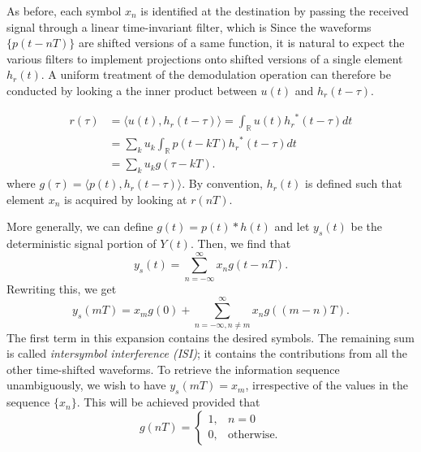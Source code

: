 As before, each symbol $x_n$ is identified at the destination by passing the received signal through a linear time-invariant filter, which is 
Since the waveforms $\{ p(t-nT) \}$ are shifted versions of a same function, it is natural to expect the various filters to implement projections onto shifted versions of a single element $h_r (t)$.
A uniform treatment of the demodulation operation can therefore be conducted by looking a the inner product between $u(t)$ and $h_r (t-\tau)$.

\begin{equation} \label{equation:InnerProductReceiver}
\begin{split}
r(\tau) &= \langle u(t), h_r (t-\tau) \rangle
= \int_{\mathbb{R}} u(t) {h_r}^*(t-\tau) dt \\
&= \sum_{k} u_k \int_{\mathbb{R}} p(t - kT) {h_r}^*(t-\tau) dt \\
&= \sum_{k} u_k g(\tau - kT) .
\end{split}
\end{equation}
where $g(\tau) = \langle p(t), h_r (t-\tau) \rangle$.
By convention, $h_r (t)$ is defined such that element $x_n$ is acquired by looking at $r(nT)$.
\fi

More generally, we can define $g(t) = p(t) * h(t)$ and let $y_s (t)$ be the deterministic signal portion of $Y(t)$.
Then, we find that
\[ y_s (t) = \sum_{n = -\infty}^{\infty} x_n g(t - nT). \]
Rewriting this, we get
\begin{equation*}
y_s (mT) = x_m g(0) + \sum_{n=-\infty,n \neq m}^{\infty} x_n g\left( (m - n)T \right) .
\end{equation*}
The first term in this expansion contains the desired symbols.
The remaining sum is called \emph{intersymbol interference (ISI)}; it contains the contributions from all the other time-shifted waveforms.
To retrieve the information sequence unambiguously, we wish to have $y_s (mT) = x_m$, irrespective of the values in the sequence $\{ x_n \}$.
This will be achieved provided that
\begin{equation} \label{equation:NoInterSymbolInterferenceSpecification}
g(nT) = \begin{cases} 1, & n = 0 \\
0, & \text{otherwise} . \end{cases}
\end{equation}

\iffalse
The random portion $r_n (t)$ of the received waveform is defined by
\[ r_n (t) = \int_{-\infty}^{\infty} N(t-\tau) h_r (\tau) d \tau. \]
\fi

